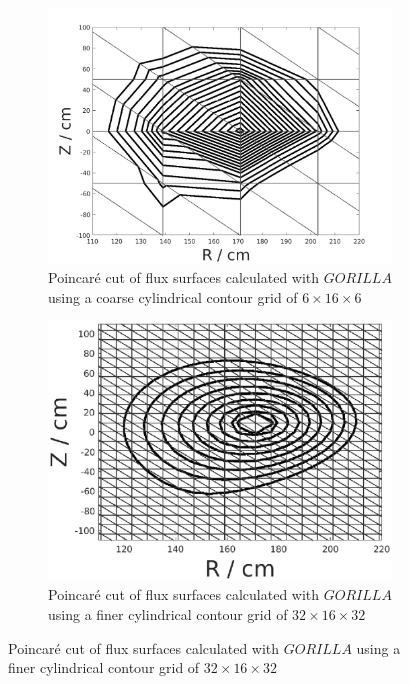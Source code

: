 \documentclass[./main.tex]{subfiles}
\begin{document}
\begin{figure}[h]
	\begin{subfigure}[b]{0.5\textwidth}
		\centering
		\includegraphics[width=\textwidth]{figures/field_lines_rect_grid.pdf}
		\captionsetup{width=1\textwidth}
		\caption{Poincar\'e cut of flux surfaces calculated with $GORILLA$ using a coarse cylindrical contour grid of $6\times16\times6$}
		\label{fig:field_lines_rect_grid}
	\end{subfigure}
	\hfill
	\begin{subfigure}[b]{0.5\textwidth}
		\includegraphics[width=\textwidth]{figures/field_lines_fine_rect_grid.eps}
		\captionsetup{width=1\textwidth}
		\caption{Poincar\'e cut of flux surfaces calculated with $GORILLA$ using a finer cylindrical contour grid of $32\times16\times32$}
		\label{fig:field_lines_fine_rect_grid}
	\end{subfigure}\hfill
\end{figure}
\end{document}
